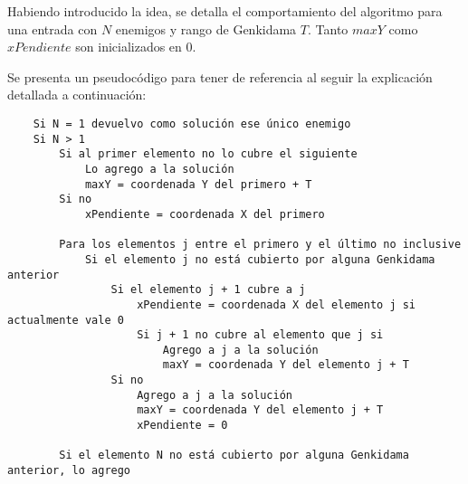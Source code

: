 	Habiendo introducido la idea, se detalla el comportamiento del algoritmo para
	una entrada con $N$ enemigos y rango de Genkidama $T$. Tanto $maxY$ como
	$xPendiente$ son inicializados en 0.

	Se presenta un pseudocódigo para tener de referencia al seguir la
	explicación detallada a continuación:

	\begin{codesnippet}
	\begin{verbatim}
	Si N = 1 devuelvo como solución ese único enemigo
	Si N > 1
	    Si al primer elemento no lo cubre el siguiente
	        Lo agrego a la solución
	        maxY = coordenada Y del primero + T
	    Si no
	        xPendiente = coordenada X del primero

	    Para los elementos j entre el primero y el último no inclusive
	        Si el elemento j no está cubierto por alguna Genkidama anterior
	            Si el elemento j + 1 cubre a j
	                xPendiente = coordenada X del elemento j si actualmente vale 0
	                Si j + 1 no cubre al elemento que j si
	                    Agrego a j a la solución
	                    maxY = coordenada Y del elemento j + T
	            Si no
	                Agrego a j a la solución
	                maxY = coordenada Y del elemento j + T
	                xPendiente = 0

	    Si el elemento N no está cubierto por alguna Genkidama anterior, lo agrego
	\end{verbatim}
	\end{codesnippet}

